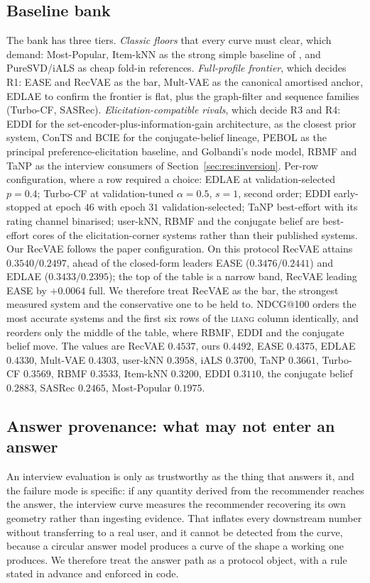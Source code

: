 \documentclass[manuscript,screen,review]{acmart}
\begin{document}
\subsection{Baseline bank}
The bank has three tiers. \emph{Classic floors} that every curve must clear, which \citet{dacrema2019progress} demand: Most-Popular, Item-kNN as the strong simple baseline of \citet{cremonesi2010performance}, and PureSVD/iALS as cheap fold-in references. \emph{Full-profile frontier}, which decides R1: EASE and RecVAE as the bar, Mult-VAE as the canonical amortised anchor, EDLAE to confirm the frontier is flat, plus the graph-filter and sequence families (Turbo-CF, SASRec). \emph{Elicitation-compatible rivals}, which decide R3 and R4: EDDI for the set-encoder-plus-information-gain architecture, \citet{biyik2023soft} as the closest prior system, ConTS and BCIE for the conjugate-belief lineage, PEBOL as the principal preference-elicitation baseline, and Golbandi's node model, RBMF and TaNP as the interview consumers of Section~\ref{sec:res:inversion}. Per-row configuration, where a row required a choice: EDLAE at validation-selected $p{=}0.4$; Turbo-CF at validation-tuned $\alpha{=}0.5$, $s{=}1$, second order; EDDI early-stopped at epoch $46$ with epoch $31$ validation-selected; TaNP best-effort with its rating channel binarised; user-kNN, RBMF and the conjugate belief are best-effort cores of the elicitation-corner systems rather than their published systems. Our RecVAE follows the paper configuration. On this protocol RecVAE attains $0.3540/0.2497$, ahead of the closed-form leaders EASE ($0.3476/0.2441$) and EDLAE ($0.3433/0.2395$); the top of the table is a narrow band, RecVAE leading EASE by $+0.0064$ full. We therefore treat RecVAE as the bar, the strongest measured system and the conservative one to be held to. NDCG@100 orders the most accurate systems and the first six rows of the \textsc{liang} column identically, and reorders only the middle of the table, where RBMF, EDDI and the conjugate belief move. The values are RecVAE $0.4537$, ours $0.4492$, EASE $0.4375$, EDLAE $0.4330$, Mult-VAE $0.4303$, user-kNN $0.3958$, iALS $0.3700$, TaNP $0.3661$, Turbo-CF $0.3569$, RBMF $0.3533$, Item-kNN $0.3200$, EDDI $0.3110$, the conjugate belief $0.2883$, SASRec $0.2465$, Most-Popular $0.1975$.

\subsection{Answer provenance: what may not enter an answer}\label{sec:provenance}
An interview evaluation is only as trustworthy as the thing that answers it, and the failure mode is specific: if any quantity derived from the recommender reaches the answer, the interview curve measures the recommender recovering its own geometry rather than ingesting evidence. That inflates every downstream number without transferring to a real user, and it cannot be detected from the curve, because a circular answer model produces a curve of the shape a working one produces. We therefore treat the answer path as a protocol object, with a rule stated in advance and enforced in code.
\end{document}

